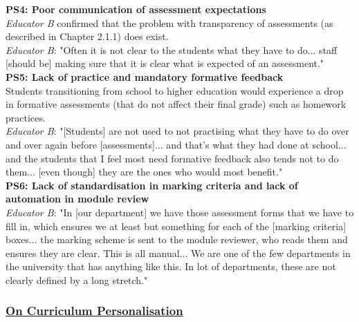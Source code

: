\textbf{PS4: Poor communication of assessment expectations}\\
\textit{Educator B} confirmed that the problem with transparency of assessments (as described in Chapter 2.1.1) 
does exist.\\
\textit{Educator B}: "Often it is not clear to the students what they have to do... staff [should be] making sure 
that it is clear what is expected of an assessment."\vspace{0.25cm}\\
\textbf{PS5: Lack of practice and mandatory formative feedback}\\
Students transitioning from school to higher education would experience a drop in formative assessments
(that do not affect their final grade) such as homework practices.\\
\textit{Educator B}: "[Students] are not used to not practising what they have to do over and over again before
[assessments]... and that's what they had done at school... and the students that I feel most need 
formative feedback also tends not to do them... [even though] they are the ones who would most benefit."
\vspace{0.25cm}\\
\textbf{PS6: Lack of standardisation in marking criteria and lack of automation in module review}\\
\textit{Educator B}: "In [our department] we have those assessment forms that we have to fill in, which ensures 
we at least but something for each of the [marking criteria] boxes... the marking scheme is sent to the module 
reviewer, who reads them and ensures they are clear. This is all manual... We are one of the few departments 
in the university that has anything like this. In lot of departments, these are not clearly defined 
by a long stretch."

\subsubsection{\underline{On Curriculum Personalisation}}

